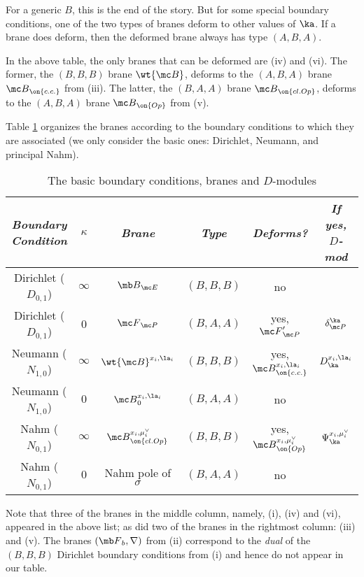 \documentclass[11pt,reqno]{amsart}
\theoremstyle{plain}
\numberwithin{equation}{section}
\theoremstyle{definition}
\begin{document}
For a generic $B$, this is the end of the story. But for some special
boundary conditions, one of the two types of branes deform to other
values of $\ka$.  If a brane does deform, then the deformed brane
always has type $(A,B,A)$.

In the above table, the only branes that can be deformed are (iv) and
(vi). The former, the $(B,B,B)$ brane $\wt{\mc B}$, deforms to the
$(A,B,A)$ brane ${\mc B}_{\on{c.c.}}$ from (iii). The latter, the
$(B,A,A)$ brane ${\mc B}_{\on{cl.Op}}$, deforms to the $(A,B,A)$ brane
${\mc B}_{\on{Op}}$ from (v).

Table \ref{bcbr} organizes the branes according to the boundary
conditions to which they are associated (we only consider the basic
ones: Dirichlet, Neumann, and principal Nahm).

\begin{table}[h]
\begin{center}
\begin{tabular}{|c||c||c||c||c||c|}
\hline
{\em Boundary Condition} & $\kappa$ & {\em Brane} & {\em Type} & {\em
  Deforms?} & {\em If yes, $D$-mod} \\
\hline \hline
Dirichlet ($D_{0,1}$) & $\infty$  & ${\mb B}_{\mc E}$ & $(B,B,B)$
& no & \\
\hline
Dirichlet ($D_{0,1}$) & $0$ & ${\mc F}_{\mc P}$ & $(B,A,A)$
& yes, ${\mc F}'_{\mc P}$ & $\delta^\ka_{\mc P}$ \\
\hline
Neumann ($N_{1,0}$) & $\infty$ & $\wt{\mc B}^{x_i,\la_i}$ & $(B,B,B)$ &
yes, ${\mc B}_{\on{c.c.}}^{x_i,\la_i}$ & $D^{x_i,\la_i}_\ka$ \\
\hline
Neumann ($N_{1,0}$) & $0$ & ${\mc B}_0^{x_i,\la_i}$ & $(B,A,A)$ &
no & \\
\hline
Nahm ($N_{0,1}$) & $\infty$ & ${\mc B}_{\on{cl.Op}}^{x_i,\mu^\vee_i}$
& $(B,B,B)$ & yes, ${\mc B}_{\on{Op}}^{x_i,\mu^\vee_i}$ &
$\Psi^{x_i,\mu^\vee_i}_\ka$ \\
\hline
Nahm ($N_{0,1}$) & $0$ & Nahm pole of $\sigma$ & $(B,A,A)$ & no &
\\
\hline
\end{tabular} 
\end{center}
\vspace*{5mm}
\caption{The basic boundary conditions, branes and
  $D$-modules}\label{bcbr}
\end{table}

Note that three of the branes in the middle column, namely, (i), (iv)
and (vi), appeared in the above list; as did two of the branes in the
rightmost column: (iii) and (v). The branes $({\mb F}_b,\nabla)$ from
(ii) correspond to the {\em dual} of the $(B,B,B)$ Dirichlet boundary
conditions from (i) and hence do not appear in our table.
\end{document}

